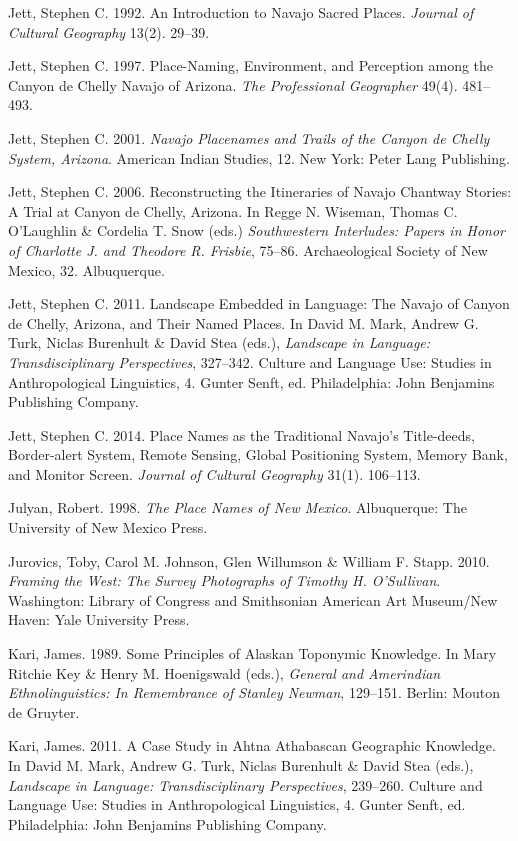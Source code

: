 \begin{hang}
	Jett, Stephen C.  1992.  An Introduction to Navajo Sacred Places.  \textit{Journal of Cultural Geography} 13(2). 29--39.

	Jett, Stephen C.  1997.  Place-Naming, Environment, and Perception among the Canyon de Chelly Navajo of Arizona.  \textit{The Professional Geographer} 49(4). 481--493.

	Jett, Stephen C.  2001. \textit{Navajo Placenames and Trails of the Canyon de Chelly System, Arizona}.  American Indian Studies, 12.  New York:  Peter Lang Publishing.

	Jett, Stephen C.  2006.  Reconstructing the Itineraries of Navajo Chantway Stories: A Trial at Canyon de Chelly, Arizona.  In Regge N. Wiseman, Thomas C. O’Laughlin \& Cordelia T. Snow (eds.) \textit{Southwestern Interludes: Papers in Honor of Charlotte J. and Theodore R. Frisbie},  75--86.  Archaeological Society of New Mexico, 32.  Albuquerque.

	Jett, Stephen C.  2011.  Landscape Embedded in Language: The Navajo of Canyon de Chelly, Arizona, and Their Named Places. In David M. Mark, Andrew G. Turk, Niclas Burenhult \& David Stea (eds.), \textit{Landscape in Language: Transdisciplinary Perspectives}, 327--342.  Culture and Language Use: Studies in Anthropological Linguistics, 4.  Gunter Senft, ed.  Philadelphia:  John Benjamins Publishing Company.

	Jett, Stephen C.  2014.  Place Names as the Traditional Navajo’s Title-deeds, Border-alert System, Remote Sensing, Global Positioning System, Memory Bank, and Monitor Screen.  \textit{Journal of Cultural Geography} 31(1). 106--113.

	Julyan, Robert. 1998. \textit{The Place Names of New Mexico}.  Albuquerque:  The University of New Mexico Press.

	Jurovics, Toby, Carol M. Johnson, Glen Willumson \& William F. Stapp. 2010. \textit{Framing the West: The Survey Photographs of Timothy H. O’Sullivan}.  Washington:  Library of Congress and Smithsonian American Art Museum/New Haven:  Yale University Press.

	Kari, James. 1989.  Some Principles of Alaskan Toponymic Knowledge.  In Mary Ritchie Key \& Henry M. Hoenigswald (eds.), \textit{General and Amerindian Ethnolinguistics: In Remembrance of Stanley Newman},  129--151.  Berlin:  Mouton de Gruyter.


	Kari, James. 2011.  A Case Study in Ahtna Athabascan Geographic Knowledge.  In David M. Mark, Andrew G. Turk, Niclas Burenhult \& David Stea (eds.), \textit{Landscape in Language: Transdisciplinary Perspectives},  239--260.  Culture and Language Use: Studies in Anthropological Linguistics, 4.  Gunter Senft, ed.  Philadelphia:  John Benjamins Publishing Company.


\end{hang}
